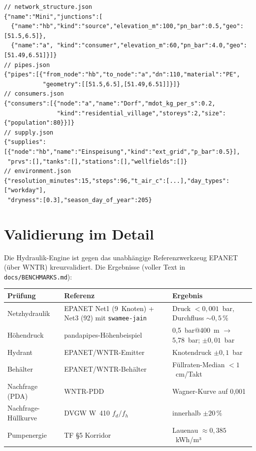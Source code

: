 \documentclass[11pt,a4paper,parskip=half]{scrreprt}
\newcommand{\api}[1]{\texttt{#1}}               %
\newcommand{\file}[1]{\texttt{#1}}              %
\begin{document}
\begin{lstlisting}[basicstyle=\ttfamily\scriptsize]
// network_structure.json
{"name":"Mini","junctions":[
  {"name":"hb","kind":"source","elevation_m":100,"pn_bar":0.5,"geo":[51.5,6.5]},
  {"name":"a", "kind":"consumer","elevation_m":60,"pn_bar":4.0,"geo":[51.49,6.51]}]}
// pipes.json
{"pipes":[{"from_node":"hb","to_node":"a","dn":110,"material":"PE",
           "geometry":[[51.5,6.5],[51.49,6.51]]}]}
// consumers.json
{"consumers":[{"node":"a","name":"Dorf","mdot_kg_per_s":0.2,
               "kind":"residential_village","storeys":2,"size":{"population":80}}]}
// supply.json
{"supplies":[{"node":"hb","name":"Einspeisung","kind":"ext_grid","p_bar":0.5}],
 "prvs":[],"tanks":[],"stations":[],"wellfields":[]}
// environment.json
{"resolution_minutes":15,"steps":96,"t_air_c":[...],"day_types":["workday"],
 "dryness":[0.3],"season_day_of_year":205}
\end{lstlisting}

\chapter{Validierung im Detail}
\label{app:validierung}

Die Hydraulik-Engine ist gegen das unabhängige Referenzwerkzeug EPANET (über
WNTR) kreuzvalidiert. Die Ergebnisse (voller Text in \file{docs/BENCHMARKS.md}):

\begin{center}
\small
\begin{tabularx}{\linewidth}{@{}lXl@{}}
\toprule
Prüfung & Referenz & Ergebnis \\
\midrule
Netzhydraulik & EPANET Net1 (9~Knoten) + Net3 (92) mit \api{swamee-jain}
  & Druck $<0{,}001$~bar, Durchfluss $\sim0{,}5\,\%$ \\
Höhendruck & pandapipes-Höhenbeispiel & 0{,}5~bar@400~m $\to$ 5{,}78~bar; $\pm0{,}01$~bar \\
Hydrant & EPANET/WNTR-Emitter & Knotendruck $\pm0{,}1$~bar \\
Behälter & EPANET/WNTR-Behälter & Füllraten-Median $<1$~cm/Takt \\
Nachfrage (PDA) & WNTR-PDD & Wagner-Kurve auf 0{,}001 \\
Nachfrage-Hüllkurve & DVGW W~410 $f_d/f_h$ & innerhalb $\pm20\,\%$ \\
Pumpenergie & TF §5 Korridor & Lauenau $\approx0{,}385$~kWh/m³ \\
\bottomrule
\end{tabularx}
\end{center}
\end{document}
